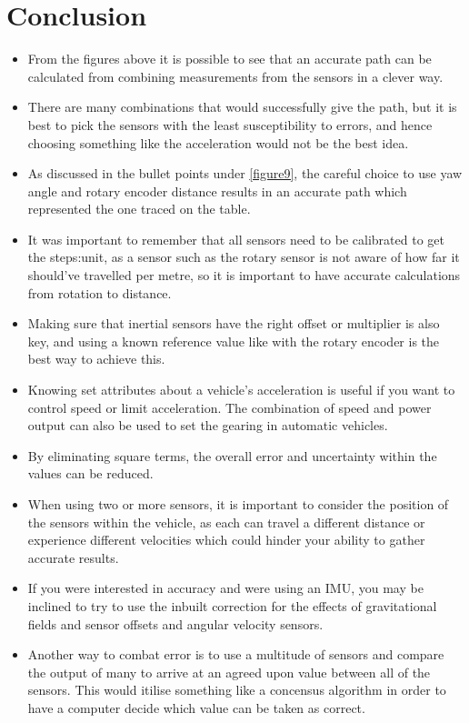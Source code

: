 \documentclass[12pt]{article}
\begin{document}
    \section{Conclusion}
    \begin{itemize}
        \item From the figures above it is possible to see that an accurate path can be calculated from combining measurements from the sensors
        in a clever way.
        \item There are many combinations that would successfully give the path, but it is best to pick the sensors with the least susceptibility
        to errors, and hence choosing something like the acceleration would not be the best idea.
        \item As discussed in the bullet points under \ref{figure9}, the careful choice to use yaw angle and rotary encoder distance results 
        in an accurate path which represented the one traced on the table. 
        \item It was important to remember that all sensors need to be calibrated to get the steps:unit, as a sensor such as the rotary sensor
        is not aware of how far it should've travelled per metre, so it is important to have accurate calculations from rotation to distance.
        \item Making sure that inertial sensors have the right offset or multiplier is also key, and using a known reference value like with 
        the rotary encoder is the best way to achieve this.
        \item Knowing set attributes about a vehicle's acceleration is useful if you want to control speed or limit acceleration. The combination
        of speed and power output can also be used to set the gearing in automatic vehicles.
        \item By eliminating square terms, the overall error and uncertainty within the values can be reduced.
        \item When using two or more sensors, it is important to consider the position of the sensors within the vehicle,
        as each can travel a different distance or experience different velocities which could hinder your ability to gather accurate results.
        \item If you were interested in accuracy and were using an IMU, you may be inclined to try to use the inbuilt correction for the effects
        of gravitational fields and sensor offsets and angular velocity sensors. 
        \item Another way to combat error is to use a multitude of sensors and compare the output of many to arrive at an agreed upon value
        between all of the sensors. This would itilise something like a concensus algorithm in order to have a computer decide which value can be taken
        as correct.
    \end{itemize}
\end{document}
